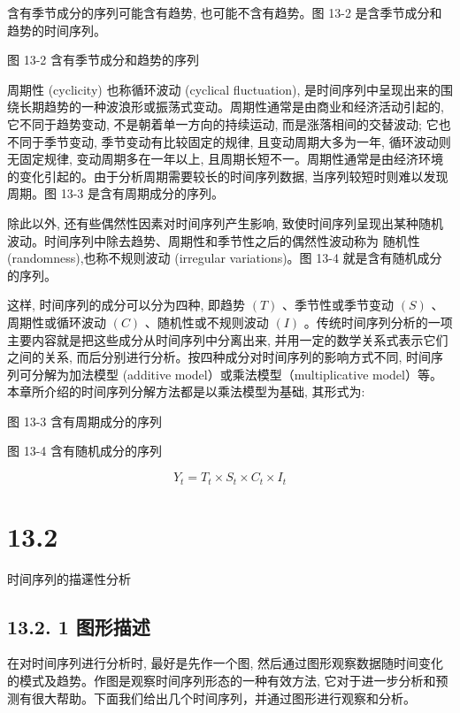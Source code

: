 \documentclass[10pt]{article}
\begin{document}
\begin{CJK*}{UTF8}{bsmi}
含有季节成分的序列可能含有趋势, 也可能不含有趋势。图 13-2 是含季节成分和趋势的时间序列。

\begin{center}
\end{center}

图 13-2 含有季节成分和趋势的序列

周期性 (cyclicity) 也称循环波动 (cyclical fluctuation), 是时间序列中呈现出来的围绕长期趋势的一种波浪形或振荡式变动。周期性通常是由商业和经济活动引起的, 它不同于趋势变动, 不是朝着单一方向的持续运动, 而是涨落相间的交替波动; 它也不同于季节变动, 季节变动有比较固定的规律, 且变动周期大多为一年, 循环波动则无固定规律, 变动周期多在一年以上, 且周期长短不一。周期性通常是由经济环境的变化引起的。由于分析周期需要较长的时间序列数据, 当序列较短时则难以发现周期。图 13-3 是含有周期成分的序列。

除此以外, 还有些偶然性因素对时间序列产生影响, 致使时间序列呈现出某种随机波动。时间序列中除去趋势、周期性和季节性之后的偶然性波动称为 随机性 (randomness),也称不规则波动 (irregular variations)。图 13-4 就是含有随机成分的序列。

这样, 时间序列的成分可以分为四种, 即趋势 $(T)$ 、季节性或季节变动 $(S)$ 、周期性或循环波动 $(C)$ 、随机性或不规则波动 $(I)$ 。传统时间序列分析的一项主要内容就是把这些成分从时间序列中分离出来, 并用一定的数学关系式表示它们之间的关系, 而后分别进行分析。按四种成分对时间序列的影响方式不同, 时间序列可分解为加法模型 (additive model）或乘法模型（multiplicative model）等。本章所介绍的时间序列分解方法都是以乘法模型为基础, 其形式为:

\begin{center}
\end{center}

图 13-3 含有周期成分的序列

\begin{center}
\end{center}

图 13-4 含有随机成分的序列


\begin{equation*}
Y_{t}=T_{t} \times S_{t} \times C_{t} \times I_{t} \tag{13.1}
\end{equation*}


\section*{13.2}
时间序列的描䢡性分析

\subsection*{13.2. 1 图形描述}
在对时间序列进行分析时, 最好是先作一个图, 然后通过图形观察数据随时间变化的模式及趋势。作图是观察时间序列形态的一种有效方法, 它对于进一步分析和预测有很大帮助。下面我们给出几个时间序列，并通过图形进行观察和分析。


\end{CJK*}
\end{document}
